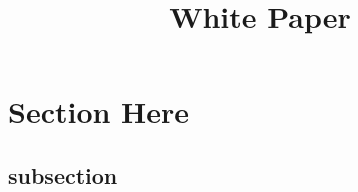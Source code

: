 \documentclass{article} %
\title{White Paper}
\begin{document}
\maketitle

\section{Section Here}

\subsection{subsection }
\end{document}
